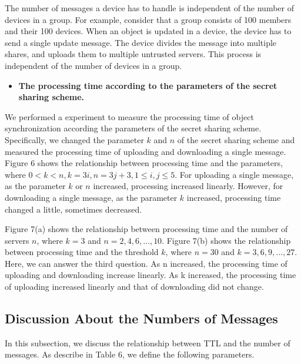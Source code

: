 \documentclass[twocolumn,10pt]{article}
\begin{document}
The number of messages a device has to handle is independent of the number of devices in a group.
For example, consider that a group consists of 100 members and their 100 devices.
When an object is updated in a device, the device has to send a single update message.
The device divides the message into multiple shares, and uploads them to multiple untrusted servers.
This process is independent of the number of devices in a group. 

\begin{itemize}[leftmargin=*]
	\setlength{\itemsep}{1pt}
	\setlength{\parskip}{0pt}
	\setlength{\parsep}{0pt}
	\item \textbf{The processing time according to the parameters of the secret sharing scheme.}
\end{itemize}

We performed a experiment to measure the processing time of object synchronization according the parameters of the secret sharing scheme.
Specifically, we changed the parameter ${k}$  and ${n}$ of the secret sharing scheme and measured the processing time of uploading and downloading a single message.
Figure 6 shows the relationship between processing time and the parameters, where ${0< k < n, k=3i, n=3j+3, 1 \leq i, j \leq 5}$.
For uploading a single message, as the parameter ${k}$ or ${n}$ increased, processing increased linearly.
However, for downloading a single message, as the parameter ${k}$ increased, processing time  changed a little, sometimes decreased.

Figure 7(a) shows the relationship between processing time and the number of servers ${n}$, where ${k=3}$ and ${n = 2, 4, 6, ... , 10}$. 
Figure 7(b) shows the relationship between processing time and the threshold ${k}$, where ${n=30}$ and ${k = 3, 6, 9, ... , 27}$. 
Here, we can answer the third question.
As n increased, the processing time of uploading and downloading increase linearly. 
As k increased, the processing time of uploading increased linearly and that of downloading did not change. 

\subsection{Discussion About the Numbers of Messages}

In this subsection, we discuss the relationship between TTL and the number of messages. 
As describe in Table 6, we define the following parameters.
\end{document}
